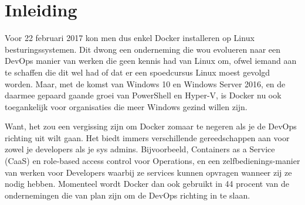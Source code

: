 
\chapter{Inleiding}
\label{ch:inleiding}




Voor 22 februari 2017 kon men dus enkel Docker installeren op Linux besturingssystemen. Dit dwong een onderneming die wou evolueren naar een DevOps manier van werken die geen kennis had van Linux om, ofwel iemand aan te schaffen die dit wel had of dat er een spoedcursus Linux moest gevolgd worden. Maar, met de komst van Windows 10 en Windows Server 2016, en de daarmee gepaard gaande groei van PowerShell en Hyper-V, is Docker nu ook toegankelijk voor organisaties die meer Windows gezind willen zijn. ~\autocite{DockerFAQ}

Want, het zou een vergissing zijn om Docker zomaar te negeren als je de DevOps richting uit wilt gaan. Het biedt immers verschillende gereedschappen aan voor zowel je developers als je sys admins. Bijvoorbeeld, Containers as a Service (CaaS) en role-based access control voor Operations, en een zelfbedienings-manier van werken voor Developers waarbij ze services kunnen opvragen wanneer zij ze nodig hebben. Momenteel wordt Docker dan ook gebruikt in 44 procent van de ondernemingen die van plan zijn om de DevOps richting in te slaan. ~\autocite{DockerDevOps}

